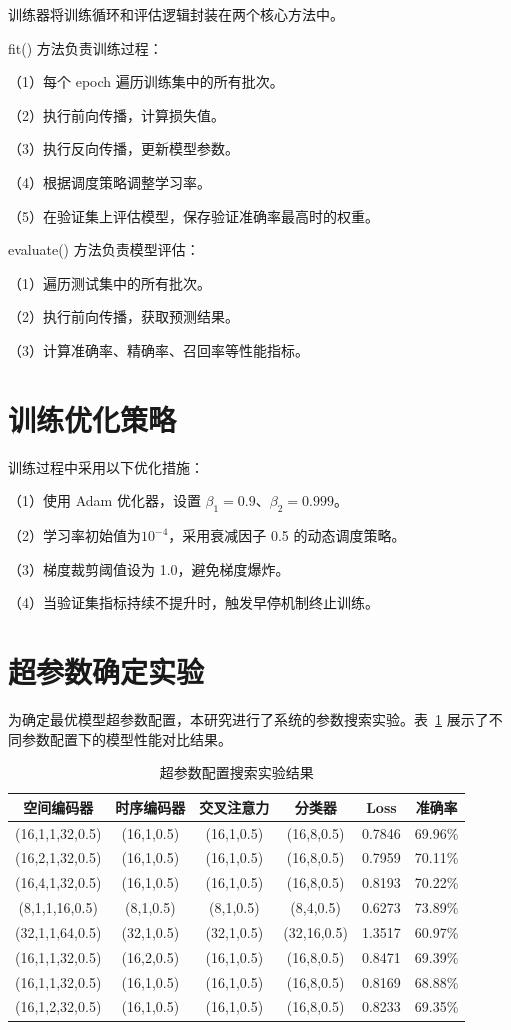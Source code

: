 训练器将训练循环和评估逻辑封装在两个核心方法中。

fit() 方法负责训练过程：

（1）每个 epoch 遍历训练集中的所有批次。

（2）执行前向传播，计算损失值。

（3）执行反向传播，更新模型参数。

（4）根据调度策略调整学习率。

（5）在验证集上评估模型，保存验证准确率最高时的权重。

evaluate() 方法负责模型评估：

（1）遍历测试集中的所有批次。

（2）执行前向传播，获取预测结果。

（3）计算准确率、精确率、召回率等性能指标。

\section{训练优化策略}

训练过程中采用以下优化措施：

（1）使用 Adam 优化器，设置 $\beta_1=0.9$、$\beta_2=0.999$。

（2）学习率初始值为$10^{-4}$，采用衰减因子 0.5 的动态调度策略。

（3）梯度裁剪阈值设为 1.0，避免梯度爆炸。

（4）当验证集指标持续不提升时，触发早停机制终止训练。

\section{超参数确定实验}

为确定最优模型超参数配置，本研究进行了系统的参数搜索实验。表~\ref{tab:parameter_search} 展示了不同参数配置下的模型性能对比结果。

\begin{table}[h]
\centering
\caption{超参数配置搜索实验结果}
\label{tab:parameter_search}
\begin{tabular}{cccccc}
\hline
空间编码器 & 时序编码器 & 交叉注意力 & 分类器 & Loss & 准确率 \\
\hline
(16,1,1,32,0.5) & (16,1,0.5) & (16,1,0.5) & (16,8,0.5) & 0.7846 & 69.96\% \\
(16,2,1,32,0.5) & (16,1,0.5) & (16,1,0.5) & (16,8,0.5) & 0.7959 & 70.11\% \\
(16,4,1,32,0.5) & (16,1,0.5) & (16,1,0.5) & (16,8,0.5) & 0.8193 & 70.22\% \\
(8,1,1,16,0.5) & (8,1,0.5) & (8,1,0.5) & (8,4,0.5) & 0.6273 & 73.89\% \\
(32,1,1,64,0.5) & (32,1,0.5) & (32,1,0.5) & (32,16,0.5) & 1.3517 & 60.97\% \\
(16,1,1,32,0.5) & (16,2,0.5) & (16,1,0.5) & (16,8,0.5) & 0.8471 & 69.39\% \\
(16,1,1,32,0.5) & (16,1,0.5) & (16,1,0.5) & (16,8,0.5) & 0.8169 & 68.88\% \\
(16,1,2,32,0.5) & (16,1,0.5) & (16,1,0.5) & (16,8,0.5) & 0.8233 & 69.35\% \\
\hline
\end{tabular}
\end{table}

